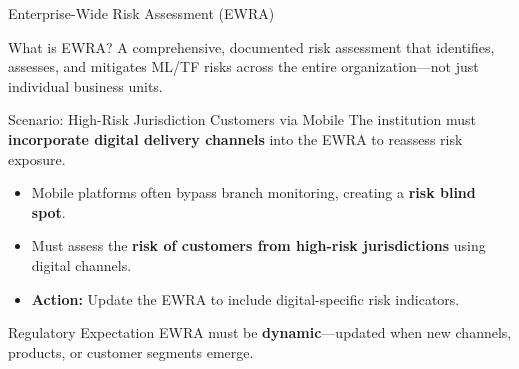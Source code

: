 \documentclass{beamer}
\begin{document}
	\begin{frame}{Enterprise-Wide Risk Assessment (EWRA)}
		\begin{block}{What is EWRA?}
			A comprehensive, documented risk assessment that identifies, assesses, and mitigates ML/TF risks across the entire organization—not just individual business units.
		\end{block}
		\begin{block}{Scenario: High-Risk Jurisdiction Customers via Mobile}
			The institution must \textbf{incorporate digital delivery channels} into the EWRA to reassess risk exposure.
			\begin{itemize}
				\item Mobile platforms often bypass branch monitoring, creating a \textbf{risk blind spot}.
				\item Must assess the \textbf{risk of customers from high-risk jurisdictions} using digital channels.
				\item \textbf{Action:} Update the EWRA to include digital-specific risk indicators.
			\end{itemize}
		\end{block}
		\begin{alertblock}{Regulatory Expectation}
			EWRA must be \textbf{dynamic}—updated when new channels, products, or customer segments emerge.
		\end{alertblock}
	\end{frame}
	
\end{document}

